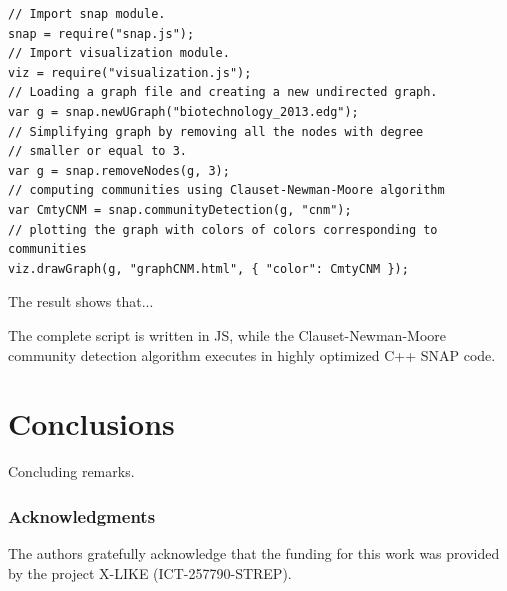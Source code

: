 \documentclass{article} %
\begin{document}
\begin{lstlisting}[caption=Graph analysis]
// Import snap module.
snap = require("snap.js");
// Import visualization module.
viz = require("visualization.js");
// Loading a graph file and creating a new undirected graph.
var g = snap.newUGraph("biotechnology_2013.edg");
// Simplifying graph by removing all the nodes with degree
// smaller or equal to 3.
var g = snap.removeNodes(g, 3);
// computing communities using Clauset-Newman-Moore algorithm
var CmtyCNM = snap.communityDetection(g, "cnm");
// plotting the graph with colors of colors corresponding to communities
viz.drawGraph(g, "graphCNM.html", { "color": CmtyCNM });
\end{lstlisting}

The result shows that...

The complete script is written in JS, while the Clauset-Newman-Moore community detection algorithm \cite{clauset-newman-moore} executes in highly optimized C++ SNAP code.

\section{Conclusions}
   Concluding remarks.

\subsubsection*{Acknowledgments}
   The authors gratefully acknowledge that the funding for this work was provided by the project X-LIKE (ICT-257790-STREP)\cite{xlike}.




\end{document}
